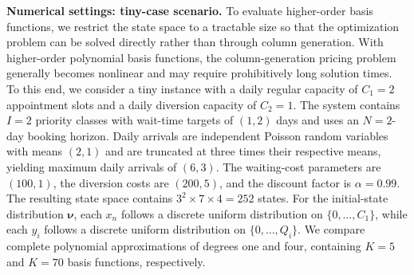 \documentclass[sglanonrev]{informs4}
\providecommand{\bA}{\boldsymbol{A}}
\providecommand{\bI}{\boldsymbol{I}}
\providecommand{\bP}{\boldsymbol{P}}
\providecommand{\bPhi}{\boldsymbol{\Phi}}
\providecommand{\bc}{\boldsymbol{c}}
\providecommand{\bg}{\boldsymbol{g}}
\providecommand{\blambda}{\boldsymbol{\lambda}}
\providecommand{\bnu}{\boldsymbol{\nu}}
\providecommand{\bw}{\boldsymbol{w}}
\providecommand{\R}{\mathbb{R}}
\providecommand{\cS}{\mathcal{S}}
\providecommand{\cA}{\mathcal{A}}
\begin{document}
\begin{APPENDICES}
\textbf{Numerical settings: tiny-case scenario.} To evaluate higher-order basis functions, we restrict the state space to a tractable size so that the optimization problem can be solved directly rather than through column generation. With higher-order polynomial basis functions, the column-generation pricing problem generally becomes nonlinear and may require prohibitively long solution times. To this end, we consider a tiny instance with a daily regular capacity of $C_1=2$ appointment slots and a daily diversion capacity of $C_2=1$. The system contains $I=2$ priority classes with wait-time targets of $(1,2)$ days and uses an $N=2$-day booking horizon. Daily arrivals are independent Poisson random variables with means $(2,1)$ and are truncated at three times their respective means, yielding maximum daily arrivals of $(6,3)$. The waiting-cost parameters are $(100,1)$, the diversion costs are $(200,5)$, and the discount factor is $\alpha=0.99$. The resulting state space contains $3^2\times7\times4=252$ states. For the initial-state distribution $\bnu$, each $x_n$ follows a discrete uniform distribution on $\{0,\ldots,C_1\}$, while each $y_i$ follows a discrete uniform distribution on $\{0,\ldots,Q_i\}$. We compare complete polynomial approximations of degrees one and four, containing $K=5$ and $K=70$ basis functions, respectively.

\end{APPENDICES}
\end{document}
